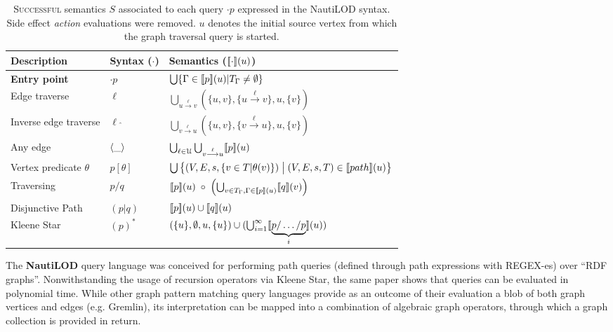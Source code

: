 \begin{table}
	\centering
	\begin{tabular}{l|ll}
		\toprule
		 Description & Syntax ($\cdot$) & Semantics ($[\! [\cdot]\!](u)$)\\
		\midrule
		\textbf{Entry point} & $\cdot p$ & $\bigcup\{\Gamma\in [\! [{p}]\!](u)|T_\Gamma\neq \emptyset\}$\\
		\midrule
		Edge traverse & $\ell$ & $\bigcup_{u\overset{\ell}{\longrightarrow}v}(\{u,v\},\{u\overset{\ell}{\longrightarrow}v\},u,\{v\})$\\
		Inverse edge traverse & $\ell\;\hat{}$ & $\bigcup_{v\overset{\ell}{\longrightarrow}u}(\{u,v\},\{v\overset{\ell}{\longrightarrow}u\},u,\{v\})$\\
		Any edge & $\Braket{\_}$ & $\bigcup_{\ell\in \mathcal{U}}\bigcup_{v\overset{\ell}{\longrightarrow}u} [\! [p]\!](u)$\\
		Vertex predicate $\theta$ & $p[\theta]$ & $\bigcup\big\{(V,E,s,\{v\in T|\theta(v)\})\;\big|\;(V,E,s,T)\in [\! [path]\!](u)\big\}$\\
		Traversing & $p/q$ &  $[\! [p]\!](u)\;\circ\;\left(\bigcup_{v\in T_\Gamma,\Gamma\in [\! [p]\!](u)} [\! [q]\!](v)\right)$\\
		Disjunctive Path & $(p|q)$ & $[\! [p]\!](u)\cup[\! [q]\!](u)$\\
		Kleene Star & $(p)^*$ & $(\{u\},\emptyset,u,\{u\})\cup(\bigcup_{i=1}^\infty [\! [\underbrace{p/\dots/p}_i]\!](u))$\\
		\bottomrule
	\end{tabular}
	\caption{\textsc{Successful} semantics $S$ associated to each query $\cdot p$ expressed in the NautiLOD syntax. Side effect \textit{action} evaluations were removed. $u$ denotes the initial source vertex from which the graph traversal query is started.
	}
	\label{tab:nautilodSem}
\end{table}


The \textbf{NautiLOD} \cite{NautiLOD} query language was conceived for performing path queries (defined through
path expressions with REGEX-es) over
``RDF graphs''. Nonwithstanding the usage of recursion operators via Kleene Star, the same paper shows  that queries can be evaluated in polynomial time.
While other graph pattern matching query languages provide as an outcome of their evaluation a blob of both graph vertices and edges (e.g. Gremlin), its interpretation can be mapped into a combination of algebraic graph operators, through which a graph collection is provided in return.  %

